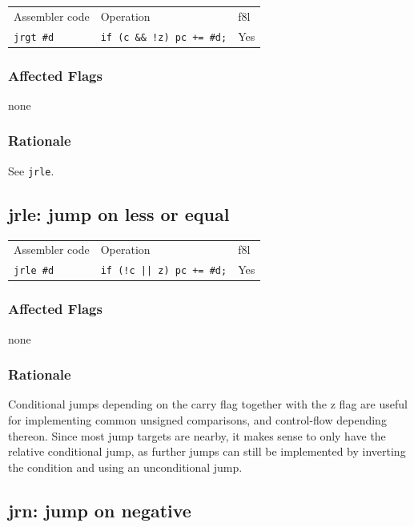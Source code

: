 \documentclass{book}
\begin{document}
\begin{tabular}{l l l}
Assembler code    & Operation                        & f8l \\
\texttt{jrgt \#d} & \texttt{if (c \&\& !z) pc += \#d;} & Yes \\
\end{tabular}

\subsubsection*{Affected Flags}

none

\subsubsection*{Rationale}

See \texttt{jrle}.


\subsection{jrle: jump on less or equal}

\begin{tabular}{l l l}
Assembler code    & Operation                        & f8l \\
\texttt{jrle \#d} & \texttt{if (!c || z) pc += \#d;} & Yes \\
\end{tabular}

\subsubsection*{Affected Flags}

none

\subsubsection*{Rationale}

Conditional jumps depending on the carry flag together with the z flag are useful for implementing common unsigned comparisons, and control-flow depending thereon. Since most jump targets are nearby, it makes sense to only have the relative conditional jump, as further jumps can still be implemented by inverting the condition and using an unconditional jump.


\subsection{jrn: jump on negative}
\end{document}
